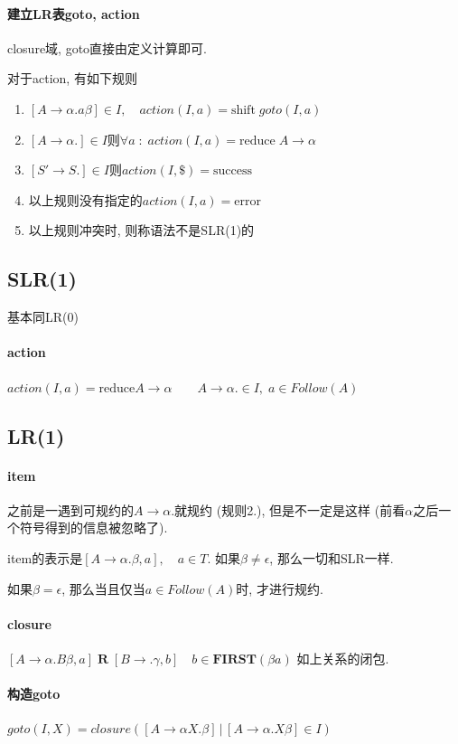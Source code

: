 \documentclass{ctexart}
\begin{document}
\paragraph{建立LR表goto, action} closure域, goto直接由定义计算即可.\par
    对于action, 有如下规则\begin{enumerate}
        \item $[A \to \alpha .a \beta] \in I,\quad action(I, a) = \text{shift}\; goto(I, a)$
        \item $[A \to \alpha.] \in I$则$\forall a \;:\; action(I, a) = \text{reduce}\;A\to\alpha$
        \item $[S' \to S.] \in I$则$action(I, \$) = \text{success}$
        \item 以上规则没有指定的$action(I, a) = \text{error}$
        \item 以上规则冲突时, 则称语法不是SLR(1)的
    \end{enumerate}

\subsection{SLR(1)}
    基本同LR(0)
\paragraph{action}
    $action(I, a) = \text{reduce} A \to \alpha \qquad A \to \alpha. \in I,\; a \in Follow(A)$

\subsection{LR(1)}
\paragraph{item} 之前是一遇到可规约的$A \to \alpha.$就规约 (规则2.),
    但是不一定是这样 (前看$\alpha$之后一个符号得到的信息被忽略了).\par
    item的表示是$[A \to \alpha . \beta, a],\quad a \in T$. 如果$\beta \neq \epsilon$, 那么一切和SLR一样.\par
    如果$\beta = \epsilon$, 那么当且仅当$a \in Follow(A)$时, 才进行规约.
\paragraph{closure} $[A \to \alpha . B \beta, a]  \; \mathbf{R} \;  [B \to .\gamma, b] \quad b \in \mathbf{FIRST}(\beta a)$
    如上关系的闭包.
\paragraph{构造goto} $goto(I, X) = closure([A \to \alpha X. \beta] \,|\, [A \to \alpha . X \beta] \in I)$
\end{document}
